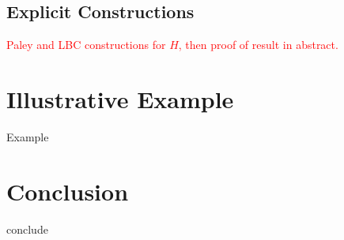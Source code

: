 \documentclass{amsart}
\theoremstyle{definition}
\theoremstyle{remark}
\numberwithin{equation}{section}
\begin{document}
\subsection{Explicit Constructions}
\textcolor{red}{Paley and LBC constructions for $H$, then proof of result in abstract.} 

\section{Illustrative Example}
Example

\section{Conclusion}
conclude




\end{document}
